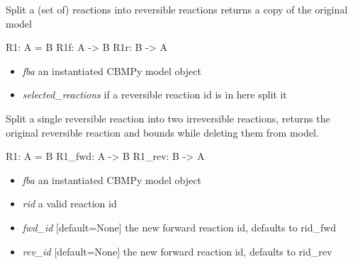\documentclass[a4paper,11pt,english]{sphinxmanual}
\begin{document}

\begin{fulllineitems}
\label{modules_doc:cbmpy.CBTools.splitReversibleReactions}
Split a (set of) reactions into reversible reactions returns a copy of the original model

R1: A = B
R1f: A -\textgreater{} B
R1r: B -\textgreater{} A
\begin{itemize}
\item {} 
\emph{fba} an instantiated CBMPy model object

\item {} 
\emph{selected\_reactions} if a reversible reaction id is in here split it

\end{itemize}

\end{fulllineitems}


\begin{fulllineitems}
\label{modules_doc:cbmpy.CBTools.splitSingleReversibleReaction}
Split a single reversible reaction into two irreversible reactions, returns the original reversible reaction and bounds
while deleting them from model.

R1: A = B
R1\_fwd: A -\textgreater{} B
R1\_rev: B -\textgreater{} A
\begin{itemize}
\item {} 
\emph{fba} an instantiated CBMPy model object

\item {} 
\emph{rid} a valid reaction id

\item {} 
\emph{fwd\_id} {[}default=None{]} the new forward reaction id, defaults to rid\_fwd

\item {} 
\emph{rev\_id} {[}default=None{]} the new forward reaction id, defaults to rid\_rev

\end{itemize}

\end{fulllineitems}
\end{document}
